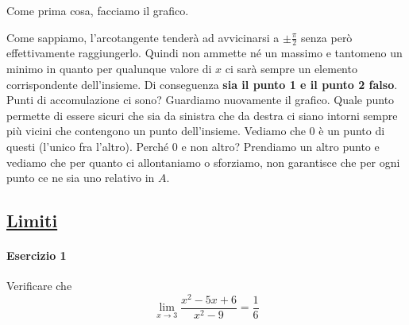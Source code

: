 Come prima cosa, facciamo il grafico.
\begin{center}
\end{center}
Come sappiamo, l'arcotangente tenderà ad avvicinarsi a $\pm\frac{\pi}{2}$ senza però effettivamente
raggiungerlo. Quindi non ammette né un massimo e tantomeno un minimo in quanto per qualunque valore
di $x$ ci sarà sempre un elemento corrispondente dell'insieme. Di conseguenza \textbf{sia il punto 1 
e il punto 2 falso}.\\
Punti di accomulazione ci sono? Guardiamo nuovamente il grafico. Quale punto permette di essere
sicuri che sia da sinistra che da destra ci siano intorni sempre più vicini che contengono un punto
dell'insieme. Vediamo che $0$ è un punto di questi (l'unico fra l'altro). Perché $0$ e non altro?
Prendiamo un altro punto e vediamo che per quanto ci allontaniamo o sforziamo, non garantisce che 
per	ogni punto ce ne sia uno relativo in $A$.

\subsection*{\hyperref[sec:limiti]{Limiti}}\label{ex:limiti}
\paragraph{Esercizio 1}
Verificare che
\begin{equation*}
  \lim\limits_{x\to3}\frac{x^2-5x+6}{x^2-9}=\frac{1}{6}
\end{equation*}
\divisor

